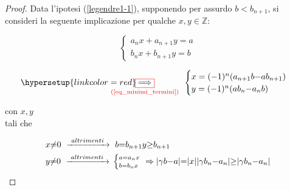 \documentclass[twoside,symmetric,justified,openany,nobib]{tufte-book}
\begin{document}
\begin{proof}
  Data l'ipotesi (\ref{legendre1-1}), supponendo per assurdo $b{<}b_{n+1}$, si consideri la seguente implicazione per qualche $x,y{\in}\mathbb{Z}$:
  
  \hspace{-10pt}\begin{minipage}[b]{0.45\linewidth}
    \[
      \begin{cases}
        a_nx {+} a_{n+1}y = a\\
        b_nx {+} b_{n+1}y = b
      \end{cases}
    \]
  \end{minipage}
  \begin{minipage}[b]{0.45\linewidth}
    \[
      \hypersetup{linkcolor=red}
      \hspace{-30pt}{\color{red} \underset{\text{(\ref{eq_minimi_termini})}}{\boxed{\color{black} \Longrightarrow}}}\hspace{5pt}
      \begin{cases}
        x = ({-}1)^n (a_{n+1}b{-}ab_{n+1})\\
        y = ({-}1)^n (ab_n{-}a_nb)
      \end{cases}
    \]
  \end{minipage}

  \hspace{-5pt}\begin{minipage}[b]{0.1\linewidth}
    \scriptsize
    con $x,y$\\
    tali che
  \end{minipage}
  \begin{minipage}[b]{0.45\linewidth}
    \[
      \begin{split}
        & x {\neq} 0\ \xrightarrow{\ altrimenti\ }\ b {=} b_{n+1}y {\geq} b_{n+1}\\
        & y {\neq} 0\ \xrightarrow{\ altrimenti\ }\, {\scriptsize \begin{cases}
            a {=} a_nx\\
            b {=} b_nx
          \end{cases}} \hspace{-5pt}\Rightarrow |\gamma b{-}a| {=} |x||\gamma b_n{-}a_n|{\geq}|\gamma b_n{-}a_n|
      \end{split}
    \]
  \end{minipage}


\end{proof}
\end{document}
